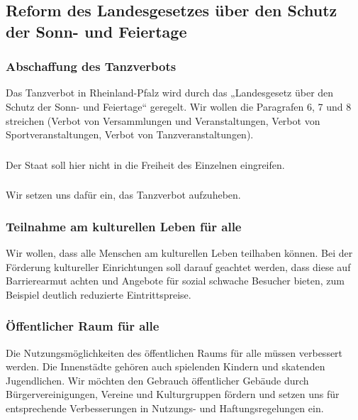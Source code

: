 \subsection*{Reform des Landesgesetzes über den Schutz der Sonn- und Feiertage}

\subsubsection{Abschaffung des Tanzverbots}
Das Tanzverbot in Rheinland-Pfalz wird durch das „Landesgesetz über den Schutz der Sonn- und Feiertage“ geregelt. Wir wollen die Paragrafen 6, 7 und 8 streichen (Verbot von Versammlungen und Veranstaltungen, Verbot von Sportveranstaltungen, Verbot von Tanzveranstaltungen).

\subsubsection{ }
\abstimmung
Der Staat soll hier nicht in die Freiheit des Einzelnen eingreifen.

\subsubsection{ }
\abstimmung
Wir setzen uns dafür ein, das Tanzverbot aufzuheben.
 

\subsubsection{Teilnahme am kulturellen Leben für alle}
\abstimmung
Wir wollen, dass alle Menschen am kulturellen Leben teilhaben können. Bei der Förderung kultureller Einrichtungen soll darauf geachtet werden, dass diese auf Barrierearmut achten und Angebote für sozial schwache Besucher bieten, zum Beispiel deutlich reduzierte Eintrittspreise.
 

\subsubsection{Öffentlicher Raum für alle}
\abstimmung
Die Nutzungsmöglichkeiten des öffentlichen Raums für alle müssen verbessert werden. Die Innenstädte gehören auch spielenden Kindern und skatenden Jugendlichen. Wir möchten den Gebrauch öffentlicher Gebäude durch Bürgervereinigungen, Vereine und Kulturgruppen fördern und setzen uns für entsprechende Verbesserungen in Nutzungs- und Haftungsregelungen ein.
